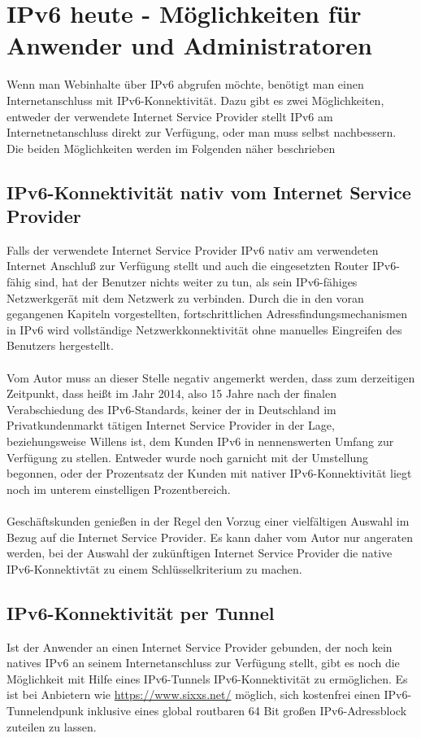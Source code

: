 \documentclass[a4paper,12pt]{scrartcl}
\begin{document}
\clearpage
\section{IPv6 heute - Möglichkeiten für Anwender und Administratoren}
Wenn man  Webinhalte \"uber IPv6 abgrufen m\"ochte, ben\"otigt man einen Internetanschluss mit IPv6-Konnektivit\"at. Dazu gibt es zwei M\"oglichkeiten, entweder der verwendete Internet Service Provider stellt IPv6 am Internetnetanschluss direkt zur Verf\"ugung, oder man muss selbst nachbessern. Die beiden M\"oglichkeiten werden im Folgenden n\"aher beschrieben

\subsection{IPv6-Konnektivit\"at nativ vom Internet Service Provider}
Falls der verwendete Internet Service Provider IPv6 nativ am verwendeten Internet Anschlu{\ss} zur Verf\"ugung stellt und auch die eingesetzten Router IPv6-f\"ahig sind, hat der Benutzer nichts weiter zu tun, als sein IPv6-f\"ahiges Netzwerkger\"at mit dem Netzwerk zu verbinden. Durch die in den voran gegangenen Kapiteln vorgestellten, fortschrittlichen Adressfindungsmechanismen in IPv6 wird vollst\"andige Netzwerkkonnektivit\"at ohne manuelles Eingreifen des Benutzers hergestellt.\\
\\
Vom Autor muss an dieser Stelle negativ angemerkt werden, dass zum derzeitigen Zeitpunkt, dass heißt im Jahr 2014, also 15 Jahre nach der finalen Verabschiedung des IPv6-Standards,  keiner der in Deutschland im Privatkundenmarkt t\"atigen Internet Service Provider in der Lage, beziehungsweise Willens ist, dem Kunden IPv6 in nennenswerten Umfang zur Verf\"ugung zu stellen. Entweder wurde noch garnicht mit der Umstellung begonnen, oder der Prozentsatz der Kunden mit nativer IPv6-Konnektivit\"at liegt noch im unterem einstelligen Prozentbereich.\\
\\
Gesch\"aftskunden genie{\ss}en in der Regel den Vorzug einer vielf\"altigen Auswahl im Bezug auf die Internet Service Provider. Es kann daher vom Autor nur angeraten werden, bei der Auswahl der zuk\"unftigen Internet Service Provider die native IPv6-Konnektivt\"at zu einem Schl\"usselkriterium zu machen.

\subsection{IPv6-Konnektivit\"at per Tunnel}
Ist der Anwender an einen Internet Service Provider gebunden, der noch kein natives IPv6 an seinem Internetanschluss zur Verf\"ugung stellt, gibt es noch die M\"oglichkeit mit Hilfe eines IPv6-Tunnels IPv6-Konnektivit\"at zu erm\"oglichen. Es ist bei Anbietern wie \url{https://www.sixxs.net/} m\"oglich, sich kostenfrei einen IPv6-Tunnelendpunk inklusive eines global routbaren 64 Bit gro{\ss}en IPv6-Adressblock zuteilen zu lassen. 
\end{document}
